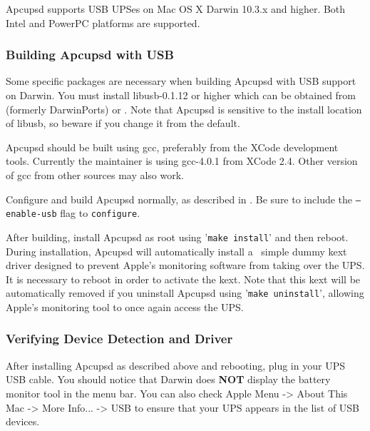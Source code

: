 Apcupsd supports USB UPSes on Mac OS X Darwin 10.3.x and higher. Both Intel
and PowerPC platforms are supported.

\subsubsection*{Building Apcupsd with USB}

Some specific packages are necessary when building Apcupsd with USB support
on Darwin. You must install libusb-0.1.12 or higher which can be obtained
from  (formerly DarwinPorts) or 
. Note that Apcupsd is
sensitive to the install location of libusb, so beware if you change it
from the default.

Apcupsd should be built using gcc, preferably from the XCode development
tools. Currently the maintainer is using gcc-4.0.1 from XCode 2.4. Other
version of gcc from other sources may also work.

Configure and build Apcupsd normally, as described in
.
Be sure to include the \texttt{{---}enable-usb} flag to \texttt{configure}.

After building, install Apcupsd as root using '\texttt{make install}' and
then reboot. During installation, Apcupsd will automatically install a \
simple dummy kext driver designed to prevent Apple's monitoring software
from taking over the UPS. It is necessary to reboot in order to activate
the kext. Note that this kext will be automatically removed if you
uninstall Apcupsd using '\texttt{make uninstall}', allowing Apple's
monitoring tool to once again access the UPS.

\subsubsection*{Verifying Device Detection and Driver}

After installing Apcupsd as described above and rebooting, plug in your
UPS USB cable. You should notice that Darwin does {\bf NOT} display the
battery monitor tool in the menu bar. You can also check Apple Menu ->
About This Mac -> More Info... -> USB to ensure that your UPS
appears in the list of USB devices.


